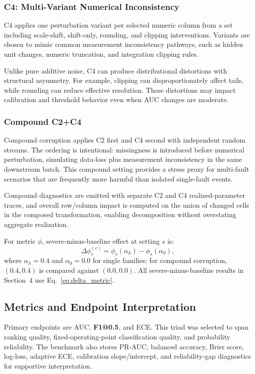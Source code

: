\documentclass{AuthorGuide/ijitcs}
\begin{document}
\subsubsection{C4: Multi-Variant Numerical Inconsistency}
C4 applies one perturbation variant per selected numeric column from a set including scale-shift, shift-only, rounding, and clipping interventions. Variants are chosen to mimic common measurement inconsistency pathways, such as hidden unit changes, numeric truncation, and integration clipping rules.

Unlike pure additive noise, C4 can produce distributional distortions with structural asymmetry. For example, clipping can disproportionately affect tails, while rounding can reduce effective resolution. These distortions may impact calibration and threshold behavior even when AUC changes are moderate.

\subsubsection{Compound C2+C4}
Compound corruption applies C2 first and C4 second with independent random streams. The ordering is intentional: missingness is introduced before numerical perturbation, simulating data-loss plus measurement inconsistency in the same downstream batch. This compound setting provides a stress proxy for multi-fault scenarios that are frequently more harmful than isolated single-fault events.

Compound diagnostics are emitted with separate C2 and C4 realized-parameter traces, and overall row/column impact is computed on the union of changed cells in the composed transformation, enabling decomposition without overstating aggregate realization.

For metric $\phi$, severe-minus-baseline effect at setting $s$ is:
\begin{equation}
\Delta\phi_s^{(c)}=\phi_s(\alpha_h)-\phi_s(\alpha_0),
\label{eq:delta_metric}
\end{equation}
where $\alpha_h=0.4$ and $\alpha_0=0.0$ for single families; for compound corruption, $(0.4,0.4)$ is compared against $(0.0,0.0)$.
All severe-minus-baseline results in Section~4 use Eq.~\eqref{eq:delta_metric}.

\subsection{Metrics and Endpoint Interpretation}
Primary endpoints are AUC, \textbf{F1@0.5}, and ECE. This triad was selected to span ranking quality, fixed-operating-point classification quality, and probability reliability. The benchmark also stores PR-AUC, balanced accuracy, Brier score, log-loss, adaptive ECE, calibration slope/intercept, and reliability-gap diagnostics for supportive interpretation.
\end{document}
